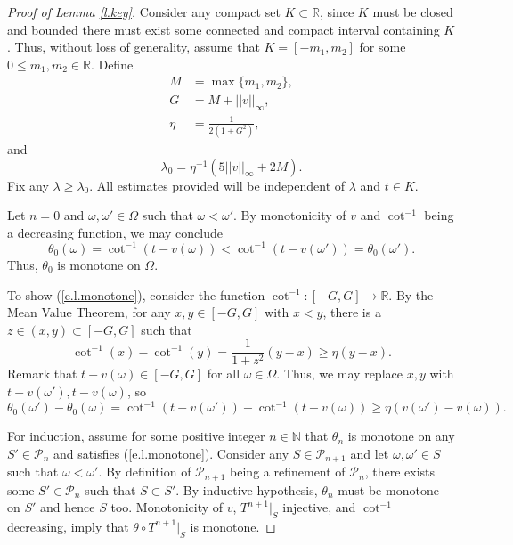 \documentclass{amsart}
\newcommand{\NN}{\mathbb{N}}
\newcommand{\RR}{\mathbb{R}}
\renewcommand{\P}{\mathcal{P}}
\begin{document}
\begin{proof}[Proof of Lemma \ref{l.key}]
    Consider any compact set $K\subset \RR$, since $K$ must be closed and bounded there must exist some connected and compact interval containing $K$. Thus, without loss of generality, assume that $K = [-m_1, m_2]$ for some $0\leq m_1, m_2\in \RR$. Define 
    \begin{align*}
        M &= \max\{m_1, m_2\},\\
        G &= M + ||v||_\infty,\\
        \eta &= \frac{1}{2(1+G^2)},
    \end{align*}
    and
    \[\lambda_0 = \eta^{-1}(5||v||_\infty+2M).\]
    Fix any $\lambda\geq \lambda_0$. All estimates provided will be independent of $\lambda$ and $t\in K$. 
    
    Let $n=0$ and $\omega,\omega'\in \Omega$ such that $\omega<\omega'$. By monotonicity of $v$ and $\cot^{-1}$ being a decreasing function, we may conclude
    \[\theta_0(\omega) = \cot^{-1}(t-v(\omega)) < \cot^{-1}(t-v(\omega')) = \theta_0(\omega').\] 
    Thus, $\theta_0$ is monotone on $\Omega$.

    To show (\ref{e.l.monotone}), consider the function $\cot^{-1}: [-G, G] \rightarrow \RR$. By the Mean Value Theorem, for any $x, y\in [-G, G]$ with $x < y$, there is a $z\in (x,y)\subset [-G, G]$ such that
    \begin{equation}\label{e.mvtcot}
        \cot^{-1}(x) - \cot^{-1}(y) = \frac{1}{1+z^2}(y-x)\geq \eta(y-x).
    \end{equation}
    Remark that $t-v(\omega) \in [-G, G]$ for all $\omega\in \Omega$. Thus, we may replace $x,y$ with $t - v(\omega'),t-v(\omega)$, so
    \[\theta_0(\omega') - \theta_0(\omega) = \cot^{-1}(t-v(\omega')) - \cot^{-1}(t-v(\omega))\geq \eta(v(\omega')-v(\omega)).\]

    For induction, assume for some positive integer $n\in \NN$ that $\theta_{n}$ is monotone on any $S'\in \P_{n}$ and satisfies (\ref{e.l.monotone}). Consider any $S\in \P_{n+1}$ and let $\omega,\omega'\in S$ such that $\omega < \omega'$. By definition of $\P_{n+1}$ being a refinement of $\P_{n}$, there exists some $S'\in \P_{n}$ such that $S\subset S'$. By inductive hypothesis, $\theta_{n}$ must be monotone on $S'$ and hence $S$ too. Monotonicity of $v$, $T^{n+1}|_S$ injective, and $\cot^{-1}$ decreasing, imply that $\theta\circ T^{n+1}|_S$ is monotone. 
    

\end{proof}
\end{document}
